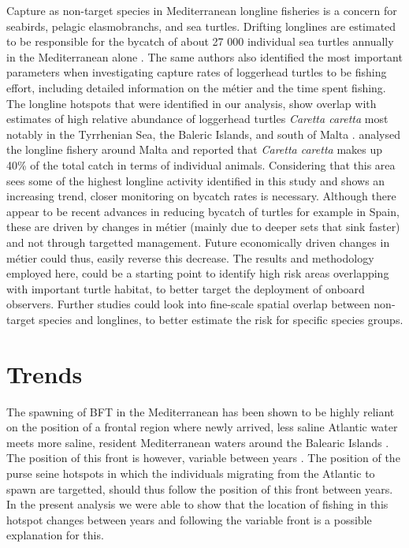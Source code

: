 Capture as non-target species in Mediterranean longline fisheries is a concern for seabirds,
pelagic elasmobranchs, and sea turtles. Drifting longlines are estimated to be responsible for the
bycatch of about 27 000 individual sea turtles annually in the Mediterranean alone
\citep{bycatch_book}. The same authors also identified the most important parameters when
investigating capture rates of loggerhead turtles to be fishing effort, including detailed
information on the métier and the time spent fishing. The longline hotspots that were identified in
our analysis, show overlap with estimates of high relative abundance of loggerhead turtles
\textit{Caretta caretta} most notably in the Tyrrhenian Sea, the Baleric Islands, and south of
Malta \citep{dimatteo_turtles,bycatch_malta}. \cite{bycatch_malta} analysed the longline fishery
around Malta and reported that \textit{Caretta caretta} makes up 40\% of the total catch in terms
of individual animals. Considering that this area sees some of the highest longline activity
identified in this study and shows an increasing trend, closer monitoring on bycatch rates is
necessary. Although there appear to be recent advances in reducing bycatch of turtles for example
in Spain, these are driven by changes in métier (mainly due to deeper sets that sink faster) and
not through targetted management. Future economically driven changes in métier could thus, easily
reverse this decrease. The results and methodology employed here, could be a starting point to
identify high risk areas overlapping with important turtle habitat, to better target the deployment
of onboard observers. Further studies could look into fine-scale spatial overlap between non-target
species and longlines, to better estimate the risk for specific species groups.

\section{Trends}
The spawning of BFT in the Mediterranean has been shown to be highly reliant on the position of a
frontal region where newly arrived, less saline Atlantic water meets more saline, resident
Mediterranean waters around the Balearic Islands \citep{reglero_12}. The position of this front is
however, variable between years \citep{balbin_14}. The position of the purse seine hotspots in
which the individuals migrating from the Atlantic to spawn are targetted, should thus follow the
position of this front between years. In the present analysis we were able to show that the
location of fishing in this hotspot changes between years and following the variable front is a
possible explanation for this.

